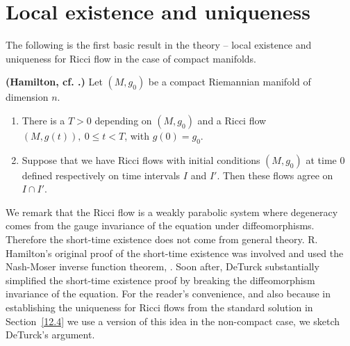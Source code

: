 \section{Local existence and uniqueness}\label{3.3} The following is the
first basic result in the theory -- local existence and uniqueness for Ricci
flow in the case of compact manifolds.

\begin{theorem}\label{thm:local-existence-uniqueness}
\label{compuniq}
{\bf (Hamilton, cf.
\cite{Hamilton3MPRC}.)} Let $(M,g_0)$ be a compact
Riemannian manifold of dimension $n$.
\begin{enumerate}
\item There is a $T>0$ depending on $(M,g_0)$ and  a Ricci flow
$(M,g(t)),\  0\le t<T$, with $g(0)=g_0$.
\item Suppose that we have Ricci flows with initial conditions $(M,g_0)$ at time
$0$ defined respectively on time intervals $I$ and $I'$. Then these
flows agree on $I\cap I'$. \end{enumerate}
\end{theorem}

\smallskip

We remark that the Ricci flow is a weakly parabolic system where
degeneracy comes from the gauge invariance of the equation under
diffeomorphisms. Therefore the short-time existence does not come
from general theory. R. Hamilton's original proof of the short-time
existence was involved and used the Nash-Moser inverse function
theorem, \cite{HamiltonIFTNM}. Soon after, DeTurck \cite{DeTurck}
substantially simplified the short-time existence proof by breaking
the diffeomorphism invariance of the equation. For the reader's
convenience, and also because in establishing the uniqueness for
Ricci flows from the standard solution in Section~\ref{12.4}
we use a version of this idea
in the non-compact case, we sketch DeTurck's argument.

